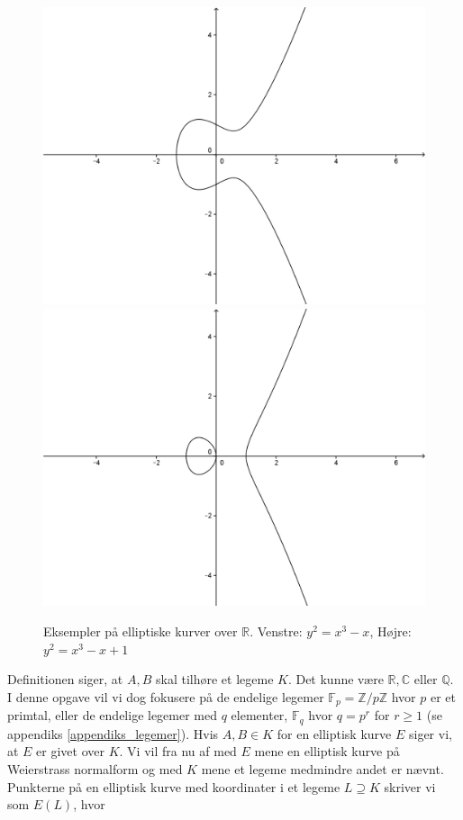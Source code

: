 \begin{figure}
\label{figure_elliptic_curves}
\centering
\includegraphics[scale=0.2]{elliptic_1}
\includegraphics[scale=0.2]{elliptic_2}
\caption{Eksempler på elliptiske kurver over $\mathbb{R}$. Venstre: $y^2 = x^3 - x$, Højre: $y^2 = x^3 -x + 1$}
\end{figure}
Definitionen siger, at $A, B$ skal tilhøre et legeme $K$. Det kunne være $\mathbb{R}, \mathbb{C}$ eller $\mathbb{Q}$. I denne opgave vil vi dog fokusere på de endelige legemer $\mathbb{F}_p = \mathbb{Z}/p\mathbb{Z}$ hvor $p$ er et primtal, eller de endelige legemer med $q$ elementer, $\mathbb{F}_q$ hvor $q = p^r$ for $r \geq 1$ (se appendiks \ref{appendiks_legemer}). Hvis $A, B \in K$ for en elliptisk kurve $E$ siger vi, at $E$ er givet over $K$. Vi vil fra nu af med $E$ mene en elliptisk kurve på Weierstrass normalform og med $K$ mene et legeme medmindre andet er nævnt. Punkterne på en elliptisk kurve med koordinater i et legeme $L \supseteq K$ skriver vi som $E(L)$, hvor 
